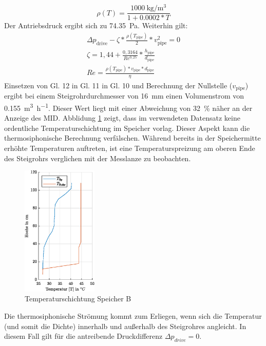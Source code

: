 \begin{equation}
	\label{eq:dens}
	\rho(T)=\frac{\SI{1000}{\kilogram\per\cubic\meter}}{1+0.0002*T}
\end{equation}
Der Antriebsdruck ergibt sich zu \SI{74,35}{\pascal}. Weiterhin gilt:
\begin{align}
	\Delta p_{\text{drive}}-\zeta*\frac{\rho(T_{\text{pipe}})}{2}*v_{\text{pipe}}^2=0\\
	\zeta=1,44+\frac{0,3164}{Re^{0,25}}*\frac{h_{\text{pipe}}}{d_{\text{pipe}}}\\
	Re=\frac{\rho(T_{\text{pipe}})*v_{\text{pipe}}*d_{\text{pipe}}}{\eta}
\end{align}
Einsetzen von Gl. 12 in Gl. 11 in Gl. 10 und Berechnung der Nullstelle ($v_{\text{pipe}}$) ergibt bei einem Steigrohrdurchmesser von \SI{16}{mm} einen Volumenstrom von \SI{0,155}{\cubic\meter\per\hour}. Dieser Wert liegt mit einer Abweichung von \SI{32}{\percent} näher an der Anzeige des MID. Abblidung \ref{fig:temp} zeigt, dass im verwendeten Datensatz keine ordentliche Temperaturschichtung im Speicher vorlag. Dieser Aspekt kann die thermosiphonische Berechnung verfälschen. Während bereits in der Speichermitte erhöhte Temperaturen auftreten, ist eine Temperaturspreizung am oberen Ende des Steigrohrs verglichen mit der Messlanze zu beobachten. 
\begin{figure}[H]
	\centering
	\includegraphics[width=0.32\textwidth]{../DATA/siphon.eps}
	\caption{Temperaturschichtung Speicher B}
	\label{fig:temp}
\end{figure}
Die thermosiphonische Strömung kommt zum Erliegen, wenn sich die Temperatur (und somit die Dichte) innerhalb und außerhalb des Steigrohres angleicht. In diesem Fall gilt für die antreibende Druckdifferenz $\Delta p_{drive}=0$.  


